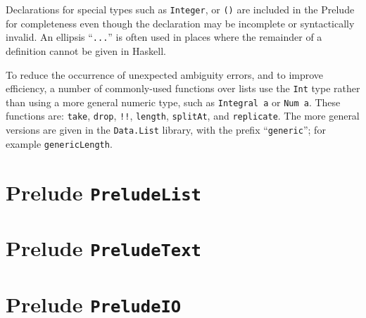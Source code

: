 Declarations for special types such as \mbox{\tt Integer}, or \mbox{\tt ()} are
included in the Prelude for completeness even though the declaration
may be incomplete or syntactically invalid.  An ellipsis ``\mbox{\tt ...}'' is often
used in places where the remainder of a definition cannot be given in Haskell.

To reduce the occurrence of unexpected ambiguity errors, and to
improve efficiency, a number of commonly-used functions over lists use
the \mbox{\tt Int} type rather than using a more general numeric type, such as
\mbox{\tt Integral\ a} or \mbox{\tt Num\ a}.  These functions are: \mbox{\tt take}, \mbox{\tt drop},
\mbox{\tt !!}, \mbox{\tt length}, \mbox{\tt splitAt}, and \mbox{\tt replicate}.  The more general
versions are given in the \mbox{\tt Data.List} library, with the prefix
``\mbox{\tt generic}''; for example \mbox{\tt genericLength}.

\clearpage
\clearpage



\section{Prelude \texorpdfstring{{\tt PreludeList}}{PreludeList}}
\label{preludelist}
\clearpage
\section{Prelude \texorpdfstring{{\tt PreludeText}}{PreludeText}}
\label{preludetext}
\cleardoublepage

\section{Prelude \texorpdfstring{{\tt PreludeIO}}{PreludeIO}}
\label{preludeio}


